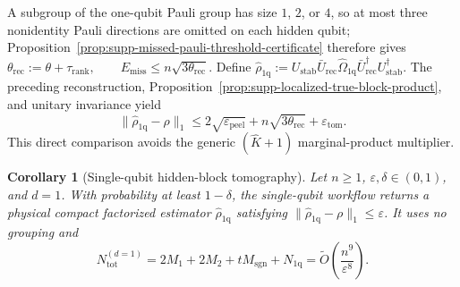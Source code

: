 \documentclass[
  aps,
  prx,
  reprint,
  superscriptaddress,
  amsmath,
  amssymb,
  nofootinbib,
  longbibliography
]{revtex4-2}
\newtheorem{corollary}[theorem]{Corollary}
\begin{document}
A subgroup of the one-qubit Pauli group has size \(1\), \(2\), or \(4\), so at most three nonidentity Pauli directions are omitted on each hidden qubit; Proposition~\ref{prop:supp-missed-pauli-threshold-certificate} therefore gives
$
\theta_{\mathrm{rec}}:=\theta+\tau_{\mathrm{rank}},
\qquad
E_{\mathrm{miss}}\le n\sqrt{3\theta_{\mathrm{rec}}}
$.
Define \(\widehat\rho_{1\mathrm q}:=U_{\mathrm{stab}}\bar U_{\mathrm{rec}}\widehat\Omega_{1\mathrm q}\bar U_{\mathrm{rec}}^\dagger U_{\mathrm{stab}}^\dagger\).  The preceding reconstruction, Proposition~\ref{prop:supp-localized-true-block-product}, and unitary invariance yield
\begin{equation}
\|\widehat\rho_{1\mathrm q}-\rho\|_1
\le2\sqrt{\varepsilon_{\mathrm{peel}}}
+n\sqrt{3\theta_{\mathrm{rec}}}+\varepsilon_{\mathrm{tom}}.
\label{eq:supp-single-qubit-error-bound}
\end{equation}
This direct comparison avoids the generic \((\widehat K+1)\) marginal-product multiplier.

\begin{corollary}[Single-qubit hidden-block tomography]
\label{cor:supp-single-qubit-hidden-block-tomography}
Let \(n\ge1\), \(\varepsilon,\delta\in(0,1)\), and \(d=1\).  With probability at least \(1-\delta\), the single-qubit workflow returns a physical compact factorized estimator \(\widehat\rho_{1\mathrm q}\) satisfying \(\|\widehat\rho_{1\mathrm q}-\rho\|_1\le\varepsilon\).  It uses no grouping and
\begin{equation}
N_{\mathrm{tot}}^{(d=1)}=2M_1+2M_2+tM_{\mathrm{sgn}}+N_{1\mathrm q}
=\widetilde O\!\left(\frac{n^9}{\varepsilon^8}\right).
\label{eq:supp-single-qubit-copy-count}
\end{equation}
\end{corollary}
\end{document}
